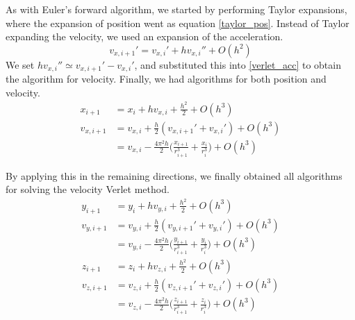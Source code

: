 \documentclass[12pt]{article}
\begin{document}
\noindent As with Euler's forward algorithm, we started by performing Taylor expansions, where the expansion of position went as equation \ref{taylor_pos}. Instead of Taylor expanding the velocity, we used an expansion of the acceleration.
\begin{equation} \label{verlet_acc}
v_{x,i+1}' = v_{x,i}' + hv_{x,i}'' + O(h^2)
\end{equation}
\noindent We set $hv_{x,i}'' \simeq v_{x,i+1}' - v_{x,i}'$, and substituted this into \ref{verlet_acc} to obtain the algorithm for velocity. Finally, we had algorithms for both position and velocity.
\begin{equation} \label{verlet_x}
\begin{split}
x_{i+1} &= x_i + hv_{x,i} + \frac{h^2}{2} + O(h^3)\\
v_{x,i+1} &= v_{x,i} + \frac{h}{2}(v_{x,i+1}' + v_{x,i}') + O(h^3)\\
&= v_{x,i} - \frac{4 \pi^2 h}{2} \Big(\frac{x_{i+1}}{r_{i+1}^3} +\frac{x_i}{r_i^3} \Big) + O(h^3)
\end{split}
\end{equation}

\noindent By applying this in the remaining directions, we finally obtained all algorithms for solving the velocity Verlet method.
\begin{equation} \label{verlet_y}
\begin{split}
y_{i+1} &= y_i + hv_{y,i} + \frac{h^2}{2} + O(h^3)\\
v_{y,i+1} &= v_{y,i} + \frac{h}{2}(v_{y,i+1}' + v_{y,i}') + O(h^3)\\
&= v_{y,i} - \frac{4 \pi^2 h}{2} \Big(\frac{y_{i+1}}{r_{i+1}^3} +\frac{y_i}{r_i^3} \Big) + O(h^3)
\end{split} 
\end{equation}
\begin{equation} \label{verlet_z}
\begin{split}
z_{i+1} &= z_i + hv_{z,i} + \frac{h^2}{2} + O(h^3)\\
v_{z,i+1} &= v_{z,i} + \frac{h}{2}(v_{z,i+1}' + v_{z,i}') + O(h^3)\\
&= v_{z,i} - \frac{4 \pi^2 h}{2} \Big(\frac{z_{i+1}}{r_{i+1}^3} +\frac{z_i}{r_i^3} \Big) + O(h^3)
\end{split} 
\end{equation}



%
%

\end{document}
